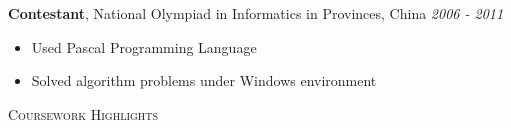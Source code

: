 \documentclass[a4paper, 12pt]{article}
\newenvironment{changemargin}[2]{%
  \begin{list}{}{%
      \setlength{\topsep}{0pt}%
      \setlength{\leftmargin}{#1}%
      \setlength{\rightmargin}{#2}%
      \setlength{\listparindent}{\parindent}%
      \setlength{\itemindent}{\parindent}%
      \setlength{\parsep}{\parskip}%
    }%
  \item[]}{\end{list}
}
\newcommand{\lineover}{
  \begin{changemargin}{-0.05in}{-0.05in}
    \vspace*{-8pt}
    \hrulefill \\
    \vspace*{-2pt}
  \end{changemargin}
}
\newcommand{\header}[1]{
  \begin{changemargin}{-0.5in}{-0.5in}
    \scshape{#1}\\
    \lineover
  \end{changemargin}
}
\newenvironment{body}
{
\vspace*{-16pt}
\begin{changemargin}{-0.25in}{-0.5in}
}	
{
\end{changemargin}
}
\begin{document}
\begin{body}
  \textbf {Contestant}, {National Olympiad in Informatics in Provinces, China} \hfill \emph{2006 - 2011}\\
  \vspace*{-4pt}
  \begin{itemize} \itemsep -0pt \small
  \item Used Pascal Programming Language
  \item Solved algorithm problems under Windows environment
  \end{itemize}
\end{body}

%
%
%
%
\pagebreak
\smallskip
\medskip
\header{Coursework Highlights}
\end{document}
